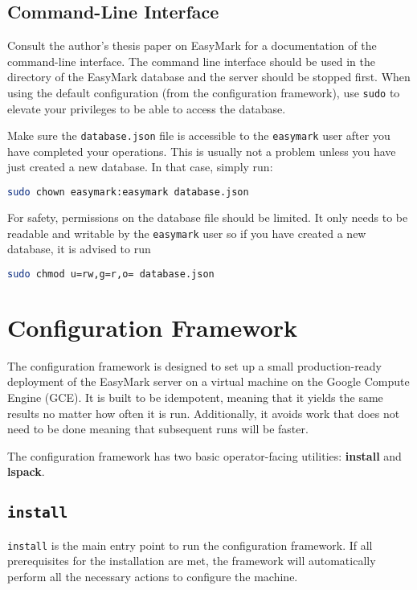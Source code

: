 \documentclass[12pt,a4paper]{report}
\begin{document}
	\section{Command-Line Interface}
	Consult the author's thesis paper on EasyMark for a documentation of the command-line interface. The command line interface should be used in the directory of the EasyMark database and the server should be stopped first. When using the default configuration (from the configuration framework), use \lstinline|sudo| to elevate your privileges to be able to access the database.

	Make sure the \lstinline|database.json| file is accessible to the \lstinline|easymark| user after you have completed your operations. This is usually not a problem unless you have just created a new database. In that case, simply run:

	\begin{lstlisting}[language=bash]
		sudo chown easymark:easymark database.json
	\end{lstlisting}

	For safety, permissions on the database file should be limited. It only needs to be readable and writable by the \lstinline|easymark| user so if you have created a new database, it is advised to run

	\begin{lstlisting}[language=bash]
		sudo chmod u=rw,g=r,o= database.json
	\end{lstlisting}

	\chapter{Configuration Framework}
	The configuration framework is designed to set up a small production-ready deployment of the EasyMark server on a virtual machine on the Google Compute Engine (GCE). It is built to be idempotent, meaning that it yields the same results no matter how often it is run. Additionally, it avoids work that does not need to be done meaning that subsequent runs will be faster.

	The configuration framework has two basic operator-facing utilities: \textbf{install} and \textbf{lspack}.

	\section{\lstinline|install|}
	\lstinline|install| is the main entry point to run the configuration framework. If all prerequisites for the installation are met, the framework will automatically perform all the necessary actions to configure the machine.
\end{document}
